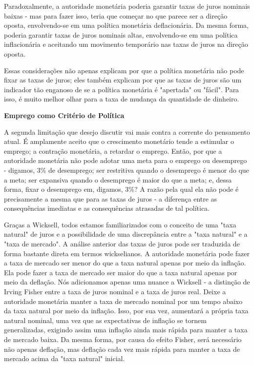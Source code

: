 \documentclass[12pt]{article}
\begin{document}
Paradoxalmente, a autoridade monetária poderia garantir taxas de juros nominais baixas - mas para fazer isso, teria que começar no que parece ser a direção oposta, envolvendo-se em uma política monetária deflacionária. Da mesma forma, poderia garantir taxas de juros nominais altas, envolvendo-se em uma política inflacionária e aceitando um movimento temporário nas taxas de juros na direção oposta.

Essas considerações não apenas explicam por que a política monetária não pode fixar as taxas de juros; eles também explicam por que as taxas de juros são um indicador tão enganoso de se a política monetária é "apertada" ou "fácil". Para isso, é muito melhor olhar para a taxa de mudança da quantidade de dinheiro.

\textbf{Emprego como Critério de Política}

A segunda limitação que desejo discutir vai mais contra a corrente do pensamento atual. É amplamente aceito que o crescimento monetário tende a estimular o emprego; a contração monetária, a retardar o emprego. Então, por que a autoridade monetária não pode adotar uma meta para o emprego ou desemprego - digamos, 3\% de desemprego; ser restritiva quando o desemprego é menor do que a meta; ser expansiva quando o desemprego é maior do que a meta; e, dessa forma, fixar o desemprego em, digamos, 3\%? A razão pela qual ela não pode é precisamente a mesma que para as taxas de juros - a diferença entre as consequências imediatas e as consequências atrasadas de tal política.

Graças a Wicksell, todos estamos familiarizados com o conceito de uma "taxa natural" de juros e a possibilidade de uma discrepância entre a "taxa natural" e a "taxa de mercado". A análise anterior das taxas de juros pode ser traduzida de forma bastante direta em termos wickselianos. A autoridade monetária pode fazer a taxa de mercado ser menor do que a taxa natural apenas por meio da inflação. Ela pode fazer a taxa de mercado ser maior do que a taxa natural apenas por meio da deflação. Nós adicionamos apenas uma nuance a Wicksell - a distinção de Irving Fisher entre a taxa de juros nominal e a taxa de juros real. Deixe a autoridade monetária manter a taxa de mercado nominal por um tempo abaixo da taxa natural por meio da inflação. Isso, por sua vez, aumentará a própria taxa natural nominal, uma vez que as expectativas de inflação se tornem generalizadas, exigindo assim uma inflação ainda mais rápida para manter a taxa de mercado baixa. Da mesma forma, por causa do efeito Fisher, será necessário não apenas deflação, mas deflação cada vez mais rápida para manter a taxa de mercado acima da "taxa natural" inicial.
\end{document}
